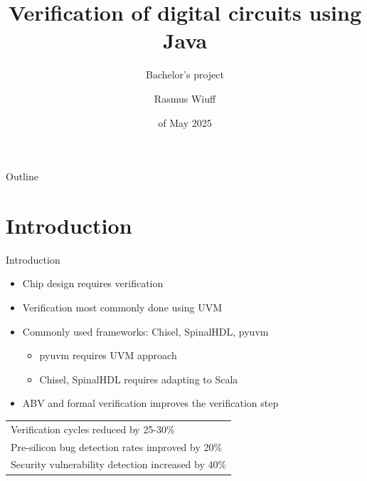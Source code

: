 \documentclass[aspectratio=169, handout]{beamer}
\title{Verification of digital circuits using Java}
\subtitle{Bachelor's project}
\author{Rasmus Wiuff}
\institute{DTU}
\date{\nth{19} of May 2025}
\begin{document}
\frame[plain]{\titlepage}

\begin{frame}{Outline}
    \tableofcontents
\end{frame}

\section{Introduction}
\begin{frame}{Introduction}
    \begin{itemize}
        \item Chip design requires verification
        \item Verification most commonly done using UVM
        \item Commonly used frameworks: Chisel, SpinalHDL, pyuvm
              \begin{itemize}
                  \item pyuvm requires UVM approach
                  \item Chisel, SpinalHDL requires adapting to Scala
              \end{itemize}
        \item ABV and formal verification improves the verification step
    \end{itemize}
    \begin{center}
        \begin{tabular}{l}
            \toprule
            Verification cycles reduced by 25-30\%             \\
            Pre-silicon bug detection rates improved by 20\%   \\
            Security vulnerability detection increased by 40\% \\
            \bottomrule
        \end{tabular}
    \end{center}
\end{frame}
\end{document}
